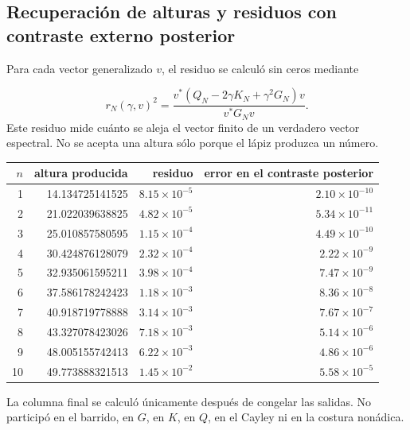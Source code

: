 \subsection{Recuperación de alturas y residuos con contraste externo posterior}
Para cada vector generalizado \(v\), el residuo se calculó sin ceros mediante\par
\[
r_N(\gamma,v)^2
=
\frac{
v^*
\left(
Q_N-2\gamma K_N+\gamma^2G_N
\right)v
}{
v^*G_Nv
}.
\]
Este residuo mide cuánto se aleja el vector finito de un verdadero vector espectral. No se acepta una altura sólo porque el lápiz produzca un número.\par
{}
\begin{center}
\small
\begin{tabularx}{\textwidth}{@{}RRRR@{}}
\toprule
\(n\) & altura producida & residuo & error en el contraste posterior \\
 & 14.134725141525 & \(8.15\times10^{-5}\) & \(2.10\times10^{-10}\) \\
2 & 21.022039638825 & \(4.82\times10^{-5}\) & \(5.34\times10^{-11}\) \\
3 & 25.010857580595 & \(1.15\times10^{-4}\) & \(4.49\times10^{-10}\) \\
4 & 30.424876128079 & \(2.32\times10^{-4}\) & \(2.22\times10^{-9}\) \\
5 & 32.935061595211 & \(3.98\times10^{-4}\) & \(7.47\times10^{-9}\) \\
6 & 37.586178242423 & \(1.18\times10^{-3}\) & \(8.36\times10^{-8}\) \\
7 & 40.918719778888 & \(3.14\times10^{-3}\) & \(7.67\times10^{-7}\) \\
8 & 43.327078423026 & \(7.18\times10^{-3}\) & \(5.14\times10^{-6}\) \\
9 & 48.005155742413 & \(6.22\times10^{-3}\) & \(4.86\times10^{-6}\) \\
10 & 49.773888321513 & \(1.45\times10^{-2}\) & \(5.58\times10^{-5}\) \\
\bottomrule
\end{tabularx}
\end{center}
La columna final se calculó únicamente después de congelar las salidas. No participó en el barrido, en \(G\), en \(K\), en \(Q\), en el Cayley ni en la costura nonádica.\par
{}
